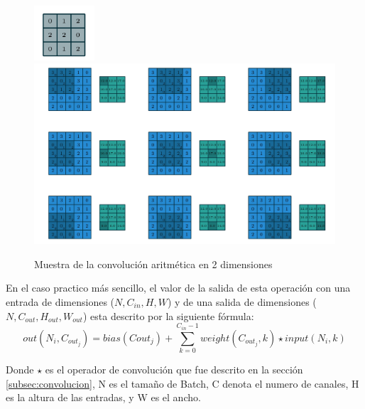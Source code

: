 \begin{figure}[H]
    \centering
    \includegraphics[width=0.2\textwidth]{images/convolucion/featuremap.png}
    \includegraphics[width=1\textwidth]{images/convolucion/ima11.jpg}
    \caption{Muestra de la convolución aritmética en 2 dimensiones}
    \label{fig:convolucionArimetica}
\end{figure}

        
        En el caso practico más sencillo, el valor de la salida de esta operación con una entrada de dimensiones ($N, C_{in}, H, W$) y de una salida de dimensiones ($N, C_{out}, H_{out}, W_{out}$)  esta descrito por la siguiente fórmula:
\begin{equation}
    out(N_i, C_{out_j})=bias(Cout_j)+\sum_{k=0}^{C_{in}-1}weight(C_{out_j},k)\star input(N_i, k)
\end{equation}

Donde $\star$ es el operador de convolución que fue descrito en la sección \ref{subsec:convolucion}, N es el tamaño de \gls{Batch}, C denota el numero de canales, H es la altura de las entradas, y W es el ancho.

